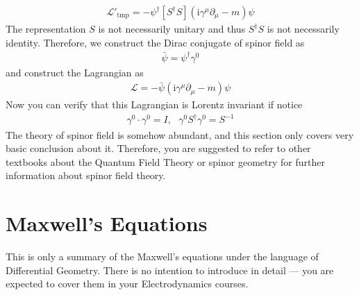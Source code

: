 \documentclass[letterpaper,10pt,english]{sphinxmanual}
\begin{document}
\begin{equation*}
\begin{split}\mathcal{L'}_{\text{tmp}} = -\psi^\dagger [S^\dagger S](\mathrm{i}\gamma^\mu\!\partial_\mu - m)\psi\end{split}
\end{equation*}
The representation \(S\) is not necessarily unitary and thus \(S^\dagger S\) is not necessarily identity. Therefore, we construct the Dirac conjugate of spinor field as
\begin{equation*}
\begin{split}\bar{\psi} = \psi^\dagger\gamma^0\end{split}
\end{equation*}
and construct the Lagrangian as
\begin{equation*}
\begin{split}\mathcal{L} = -\bar{\psi}(\mathrm{i}\gamma^\mu\!\partial_\mu - m)\psi\end{split}
\end{equation*}
Now you can verify that this Lagrangian is Lorentz invariant if notice
\begin{equation*}
\begin{split}\gamma^0\cdot\gamma^0 = I,\ \ \ \gamma^0 S^\dagger\gamma^0 = S^{-1}\end{split}
\end{equation*}
The theory of spinor field is somehow abundant, and this section only covers very basic conclusion about it. Therefore, you are suggested to refer to other textbooks about the Quantum Field Theory or spinor geometry for further information about spinor field theory.


\section{Maxwell’s Equations}
\label{\detokenize{maxwell:maxwells-equations}}\label{\detokenize{maxwell::doc}}
This is only a summary of the Maxwell’s equations under the language of Differential Geometry. There is no intention to introduce in detail — you are expected to cover them in your Electrodynamics courses.
\end{document}
